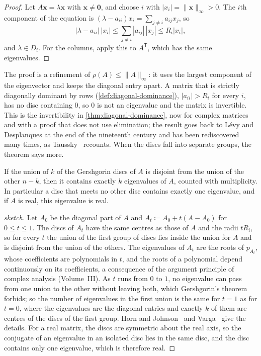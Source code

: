\begin{proof}
Let $A\mathbf x=\lambda\mathbf x$ with $\mathbf x\ne\mathbf 0$, and choose $i$ with $|x_i|=\|\mathbf x\|_\infty>0$. The $i$th component of the equation is $(\lambda-a_{ii})x_i=\sum_{j\ne i}a_{ij}x_j$, so
\[
|\lambda-a_{ii}|\,|x_i|\le\sum_{j\ne i}|a_{ij}|\,|x_j|\le R_i|x_i| ,
\]
and $\lambda\in D_i$. For the columns, apply this to $A^{\mathsf T}$, which has the same eigenvalues.
\end{proof}

The proof is a refinement of $\rho(A)\le\|A\|_\infty$: it uses the largest component of the eigenvector and keeps the diagonal entry apart. A matrix that is strictly diagonally dominant by rows (\cref{def:diagonal-dominance}), $|a_{ii}|>R_i$ for every $i$, has no disc containing $0$, so $0$ is not an eigenvalue and the matrix is invertible. This is the invertibility in \cref{thm:diagonal-dominance}, now for complex matrices and with a proof that does not use elimination; the result goes back to L\'evy and Desplanques at the end of the nineteenth century and has been rediscovered many times, as Taussky~\cite{taussky1949} recounts. When the discs fall into separate groups, the theorem says more.

\begin{theorem}
\label{thm:gershgorin-separated}
If the union of $k$ of the Gershgorin discs of $A$ is disjoint from the union of the other $n-k$, then it contains exactly $k$ eigenvalues of $A$, counted with multiplicity. In particular a disc that meets no other disc contains exactly one eigenvalue, and if $A$ is real, this eigenvalue is real.
\end{theorem}

\begin{proof}[sketch]
Let $A_0$ be the diagonal part of $A$ and $A_t\coloneqq A_0+t(A-A_0)$ for $0\le t\le1$. The discs of $A_t$ have the same centres as those of $A$ and the radii $tR_i$, so for every $t$ the union of the first group of discs lies inside the union for $A$ and is disjoint from the union of the others. The eigenvalues of $A_t$ are the roots of $p_{A_t}$, whose coefficients are polynomials in $t$, and the roots of a polynomial depend continuously on its coefficients, a consequence of the argument principle of complex analysis (Volume~III). As $t$ runs from $0$ to $1$, no eigenvalue can pass from one union to the other without leaving both, which Gershgorin's theorem forbids; so the number of eigenvalues in the first union is the same for $t=1$ as for $t=0$, where the eigenvalues are the diagonal entries and exactly $k$ of them are centres of the discs of the first group. Horn and Johnson~\cite[Sect.~6.1]{horn2013} and Varga~\cite{varga2004} give the details. For a real matrix, the discs are symmetric about the real axis, so the conjugate of an eigenvalue in an isolated disc lies in the same disc, and the disc contains only one eigenvalue, which is therefore real.
\end{proof}

